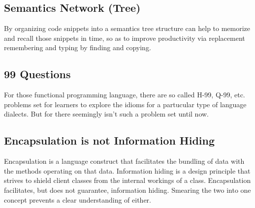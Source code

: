 \subsection*{Semantics Network (Tree)}
By organizing code snippets into a semantics tree structure can help
to memorize and recall those snippets in  time,
so as to improve productivity via replacement remembering and typing
by finding and copying.

\subsection*{ 99 Questions}
For those functional programming language, there are so called H-99, Q-99, etc. problems
set for learners to explore the idioms for a partucular type of language dialects.
But for  there seemingly isn't such a problem set until now.

\subsection*{Encapsulation is not Information Hiding}
Encapsulation is a language construct that facilitates
the bundling of data with the methods operating on that data.
Information hiding is a design principle that strives to
shield client classes from the internal workings of a class.
Encapsulation facilitates, but does not guarantee, information hiding.
Smearing the two into one concept prevents a clear understanding of either.


